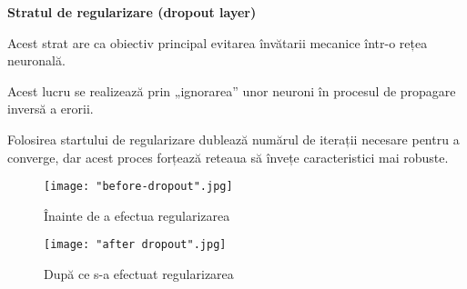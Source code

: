 \documentclass[a4paper, 12pt]{article}
\begin{document}
\begin{outline}
\begin{figure}[!htb]
\begin{minipage}{0.5\textwidth}
			\end{minipage}
			
		\end{figure}
		
		\1 \textbf{Stratul de regularizare (dropout layer)} \textbf{\cite{budhiraja_budhiraja_2016}}
		
		\quad Acest strat are ca obiectiv principal evitarea învătarii mecanice într-o rețea neuronală. 
		
		\quad Acest lucru se realizează prin „ignorarea” unor neuroni în procesul de propagare inversă a erorii. 
		
		\quad Folosirea startului de regularizare dublează numărul de iterații necesare pentru a converge, dar acest proces forțează reteaua să învețe caracteristici mai robuste.
		
		\begin{figure}[!htb]
			\centering
			\begin{minipage}{0.4\textwidth}
				\centering
				\texttt{[image: "before-dropout".jpg]}
				\caption{Înainte de a efectua regularizarea \textbf{\cite{budhiraja_budhiraja_2016}}}
			\end{minipage}\hfill
			\begin{minipage}{0.5\textwidth}
				\centering
				\texttt{[image: "after dropout".jpg]}
				\caption{După ce s-a efectuat regularizarea \textbf{\cite{budhiraja_budhiraja_2016}}}
			\end{minipage}
		\end{figure}
		
		\bigskip
	\end{outline}
	
\end{document}
